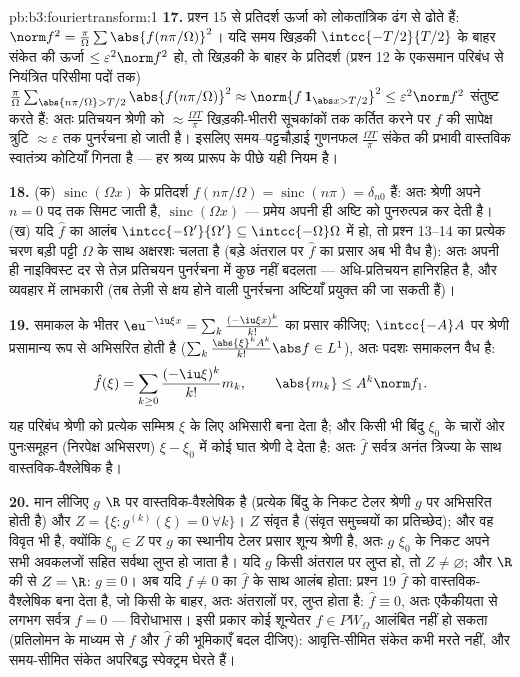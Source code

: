 \begin{solution}{pb:b3:fouriertransform:1}
\textbf{17.} प्रश्न 15 से प्रतिदर्श ऊर्जा को लोकतांत्रिक ढंग से ढोते
हैं: $\norm f^2 = \frac\pi\Omega\sum
\abs{f(n\pi/\Omega)}^2$। यदि समय खिड़की $\intcc{-T/2}{T/2}$ के बाहर संकेत की ऊर्जा $\leq \varepsilon^2\norm
f^2$ हो,
तो खिड़की के बाहर के प्रतिदर्श (प्रश्न 12 के एकसमान परिबंध से नियंत्रित
परिसीमा पदों तक) $\frac\pi\Omega\sum_{\abs{n\pi/\Omega} > T/2}
\abs{f(n\pi/\Omega)}^2 \approx \norm{f\,\mathbf 1_{\abs x >
T/2}}^2 \leq \varepsilon^2\norm f^2$ संतुष्ट करते हैं: अतः प्रतिचयन श्रेणी को
$\approx \frac{\Omega T}\pi$ खिड़की-भीतरी सूचकांकों तक कर्तित करने पर $f$ की सापेक्ष त्रुटि
$\approx\varepsilon$ तक पुनर्रचना हो जाती है। इसलिए समय--पट्टचौड़ाई गुणनफल $\frac{\Omega T}{\pi}$
संकेत की प्रभावी वास्तविक स्वातंत्र्य कोटियाँ गिनता है --- हर श्रव्य
प्रारूप के पीछे यही नियम है।

\textbf{18.} (क) $\operatorname{sinc}(\Omega x)$ के प्रतिदर्श $f(n\pi/\Omega) = \operatorname{sinc}(n\pi) =
\delta_{n0}$ हैं: अतः श्रेणी अपने $n = 0$
पद तक सिमट जाती है, $\operatorname{sinc}(\Omega x)$ --- प्रमेय अपनी ही अष्टि को पुनरुत्पन्न
कर देती है। (ख) यदि $\hat f$ का आलंब $\intcc{-\Omega'}{\Omega'} \subseteq
\intcc{-\Omega}\Omega$ में हो, तो प्रश्न 13--14 का
प्रत्येक चरण बड़ी पट्टी $\Omega$ के साथ अक्षरशः चलता है (बड़े अंतराल पर
$\hat f$ का प्रसार अब भी वैध है): अतः अपनी ही नाइक्विस्ट दर से तेज़
प्रतिचयन पुनर्रचना में कुछ नहीं बदलता --- अधि-प्रतिचयन हानिरहित है,
और व्यवहार में लाभकारी (तब तेज़ी से क्षय होने वाली पुनर्रचना अष्टियाँ
प्रयुक्त की जा सकती हैं)।

\textbf{19.} समाकल के भीतर $\eu^{-\iu\xi x} =
\sum_k\frac{(-\iu\xi x)^k}{k!}$ का प्रसार कीजिए; $\intcc{-A}A$ पर श्रेणी
प्रसामान्य रूप से अभिसरित होती है ($\sum_k\frac{\abs{\xi}^kA^k}{k!}\abs f \in L^1$), अतः पदशः समाकलन वैध है:
\[
\hat f(\xi) = \sum_{k\geq0}\frac{(-\iu\xi)^k}{k!}m_k,
\qquad \abs{m_k} \leq A^k\norm f_1 .
\]
यह परिबंध श्रेणी को प्रत्येक सम्मिश्र $\xi$ के लिए अभिसारी बना देता
है; और किसी भी बिंदु $\xi_0$ के चारों ओर पुनःसमूहन (निरपेक्ष अभिसरण)
$\xi - \xi_0$ में कोई घात श्रेणी दे देता है: अतः $\hat f$ सर्वत्र अनंत त्रिज्या
के साथ वास्तविक-वैश्लेषिक है।

\textbf{20.} मान लीजिए $g$ $\R$ पर वास्तविक-वैश्लेषिक है (प्रत्येक
बिंदु के निकट टेलर श्रेणी $g$ पर अभिसरित होती है) और $Z = \{\xi :
g^{(k)}(\xi) = 0\ \forall k\}$। $Z$
संवृत है (संवृत समुच्चयों का प्रतिच्छेद); और वह विवृत भी है, क्योंकि
$\xi_0 \in Z$ पर $g$ का स्थानीय टेलर प्रसार शून्य श्रेणी है, अतः $g$
$\xi_0$ के निकट अपने सभी अवकलजों सहित सर्वथा लुप्त हो जाता है। यदि
$g$ किसी अंतराल पर लुप्त हो, तो $Z \neq \varnothing$; और $\R$ की  से
$Z = \R$: $g \equiv 0$। अब यदि $f
\neq 0$ का $\hat f$ के साथ  आलंब होता: प्रश्न 19
$\hat f$ को वास्तविक-वैश्लेषिक बना देता है, जो किसी  के बाहर, अतः
अंतरालों पर, लुप्त होता है: $\hat f \equiv 0$, अतः एकैकीयता से लगभग सर्वत्र $f = 0$
--- विरोधाभास। इसी प्रकार कोई शून्येतर $f \in
PW_\Omega$  आलंबित नहीं हो
सकता (प्रतिलोमन के माध्यम से $f$ और $\hat f$ की भूमिकाएँ बदल दीजिए):
आवृत्ति-सीमित संकेत कभी मरते नहीं, और समय-सीमित संकेत अपरिबद्ध
स्पेक्ट्रम घेरते हैं।


\end{solution}

